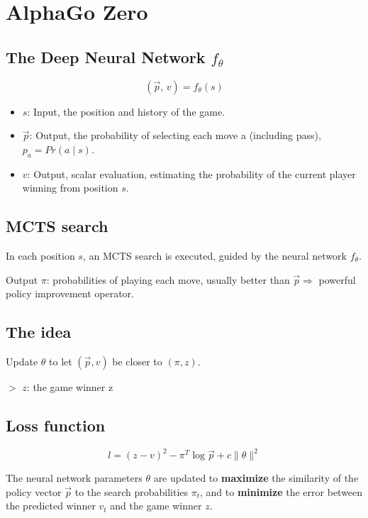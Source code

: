 \documentclass[12pt,a4paper]{article}
\newcommand{\remark}[1]{
    $>$ {\color{blue} #1}
}
\begin{document}
\section*{AlphaGo Zero}

\subsection*{The Deep Neural Network $f_{\theta}$}

\[(\vec{p},\,v) = f_{\theta}(s)\]

\begin{itemize}
    \item $s$: Input, the position and history of the game.
    \item $\vec{p}$: Output, the probability of selecting each move a (including pass), $p_a = Pr(a \mid s)$.
    \item $v$: Output, scalar evaluation, estimating the probability of the current player winning from position $s$.
\end{itemize}

\subsection*{MCTS search}

In each position $s$, an MCTS search is executed, guided by the neural network $f_{\theta}$.

Output $\pi$: probabilities of playing each move, usually better than $\vec{p} \Rightarrow$ powerful policy improvement operator.

\subsection*{The idea}

Update $\theta$ to let $(\vec{p}, v)$ be closer to $(\pi, z)$.

\remark{$z$: the game winner z}

\subsection*{Loss function}

\[l = (z - v)^2 - \pi^T \log \vec{p} + c\lVert\theta\rVert^2\]

The neural network parameters $\theta$ are updated to \textbf{maximize} the similarity of the policy vector $\vec{p}$ to the search probabilities $\pi_t$, 
and to \textbf{minimize} the error between the predicted winner $v_t$ and the game winner $z$.
\end{document}
